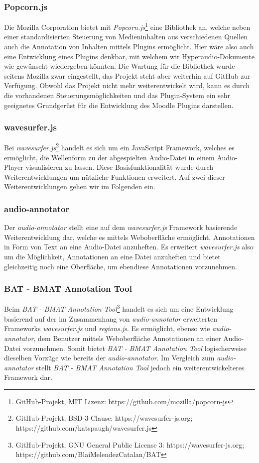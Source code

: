 \subsubsection{Popcorn.js}
Die Mozilla Corporation bietet mit \textit{Popcorn.js}\footnote{GitHub-Projekt, MIT Lizenz: https://github.com/mozilla/popcorn-js} eine Bibliothek an, welche neben einer standardisierten Steuerung von Medieninhalten aus verschiedenen Quellen auch die Annotation von Inhalten mittels Plugins ermöglicht. Hier wäre also auch eine Entwicklung eines Plugins denkbar, mit welchem wir Hyperaudio-Dokumente wie gewünscht wiedergeben könnten. Die Wartung für die Bibliothek wurde seitens Mozilla zwar eingestellt, das Projekt steht aber weiterhin auf GitHub zur Verfügung. Obwohl das Projekt nicht mehr weiterentwickelt wird, kann es durch die vorhandenen Steuerungsmöglichkeiten und das Plugin-System ein sehr geeignetes Grundgerüst für die Entwicklung des Moodle Plugins darstellen.
 
\subsubsection{wavesurfer.js}
\label{sec:wavesurfer.js}
Bei \textit{wavesurfer.js}\footnote{GitHub-Projekt, BSD-3-Clause: https://wavesurfer-js.org; https://github.com/katspaugh/wavesurfer.js} handelt es sich um ein JavaScript Framework, welches es ermöglicht, die Wellenform zu der abgespielten Audio-Datei in einem Audio-Player visualisieren zu lassen. Diese Basisfunktionalität wurde durch Weiterentwicklungen um nützliche Funktionen erweitert. Auf zwei dieser Weiterentwicklungen gehen wir im Folgenden ein.

\subsubsection{audio-annotator}
Der \textit{audio-annotator} stellt eine auf dem \textit{wavesurfer.js} Framework basierende Weiterentwicklung dar, welche es mittels Weboberfläche ermöglicht, Annotationen in Form von Text an eine Audio-Datei anzuheften. Es erweitert \textit{wavesurfer.js} also um die Möglichkeit, Annotationen an eine Datei anzuheften und bietet gleichzeitig noch eine Oberfläche, um ebendiese Annotationen vorzunehmen.

\subsubsection{BAT - BMAT Annotation Tool}
Beim \textit{BAT - BMAT Annotation Tool}\footnote{GitHub-Projekt, GNU General Public License 3: https://wavesurfer-js.org; https://github.com/BlaiMelendezCatalan/BAT} handelt es sich um eine Entwicklung basierend auf der im Zusammenhang von \textit{audio-annotator} erweiterten Frameworks \textit{wavesurfer.js} und \textit{regions.js}. Es ermöglicht, ebenso wie \textit{audio-annotator}, dem Benutzer mittels Weboberfläche Annotationen an einer Audio-Datei vorzunehmen. Somit bietet \textit{BAT - BMAT Annotation Tool} logischerweise dieselben Vorzüge wie bereits der \textit{audio-annotator}. Im Vergleich zum \textit{audio-annotator} stellt \textit{BAT - BMAT Annotation Tool} jedoch ein weiterentwickelteres Framework dar.

